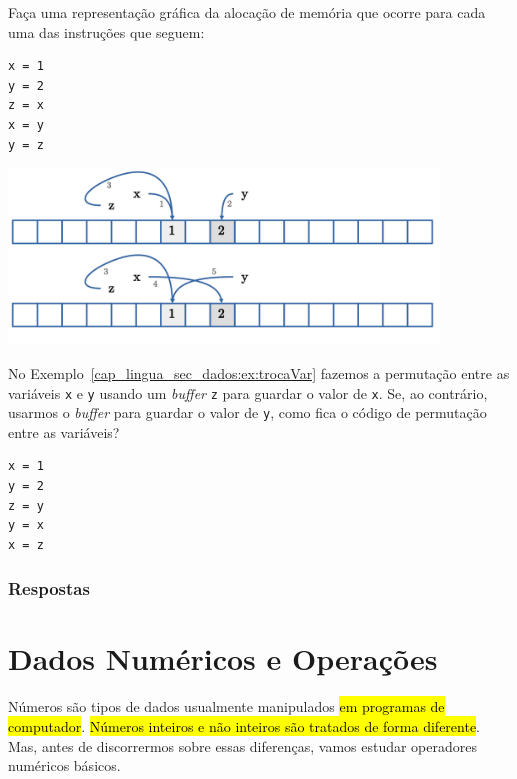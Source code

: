 \begin{exer}
  Faça uma representação gráfica da alocação de memória que ocorre para cada uma das instruções {\python} que seguem:

\begin{lstlisting}
x = 1
y = 2
z = x
x = y
y = z
\end{lstlisting}

\end{exer}
\begin{resp}

  \includegraphics[width=4.5in]{./cap_lingua/dados/fig_aloc_mem/exerPermutacao.jpg}

\end{resp}

\begin{exer}
  No Exemplo~\ref{cap_lingua_sec_dados:ex:trocaVar} fazemos a permutação entre as variáveis \lstinline+x+ e \lstinline+y+ usando um \textit{buffer} \lstinline+z+ para guardar o valor de \lstinline+x+. Se, ao contrário, usarmos o \textit{buffer} para guardar o valor de \lstinline+y+, como fica o código de permutação entre as variáveis?
\end{exer}
\begin{resp}

\begin{lstlisting}
x = 1
y = 2
z = y
y = x
x = z
\end{lstlisting}

\end{resp}

\ifisbook
\subsubsection{Respostas}
\shipoutAnswer
\fi

\section{Dados Numéricos e Operações}\label{cap_lingua_sec_numop}

Números são tipos de dados usualmente manipulados \hl{em programas de computador}. \hl{Números inteiros e não inteiros são tratados de forma diferente}. Mas, antes de discorrermos sobre essas diferenças, vamos estudar operadores numéricos básicos.

